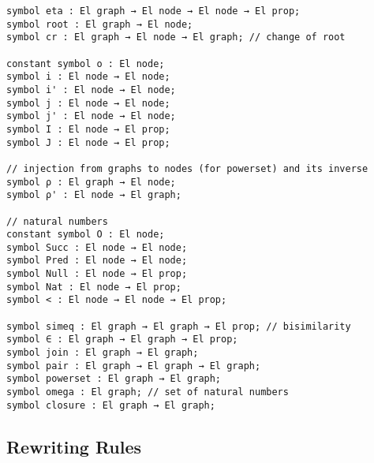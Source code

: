 \documentclass[submission,copyright,creativecommons]{eptcs}
\begin{document}
\begin{lstlisting}
symbol eta : El graph → El node → El node → El prop;
symbol root : El graph → El node;
symbol cr : El graph → El node → El graph; // change of root

constant symbol o : El node;
symbol i : El node → El node;
symbol i' : El node → El node;
symbol j : El node → El node;
symbol j' : El node → El node;
symbol I : El node → El prop;
symbol J : El node → El prop;

// injection from graphs to nodes (for powerset) and its inverse
symbol ρ : El graph → El node;
symbol ρ' : El node → El graph;

// natural numbers
constant symbol O : El node;
symbol Succ : El node → El node;
symbol Pred : El node → El node;
symbol Null : El node → El prop;
symbol Nat : El node → El prop;
symbol < : El node → El node → El prop;

symbol simeq : El graph → El graph → El prop; // bisimilarity
symbol ∈ : El graph → El graph → El prop;
symbol join : El graph → El graph;
symbol pair : El graph → El graph → El graph;
symbol powerset : El graph → El graph;
symbol omega : El graph; // set of natural numbers
symbol closure : El graph → El graph;
\end{lstlisting}

\subsection{Rewriting Rules}
\end{document}
